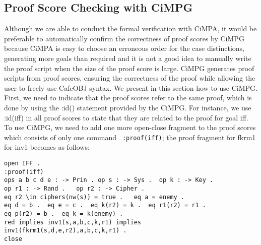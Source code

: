 \documentclass[a4paper,fleqn]{cas-dc}
\begin{document}
\subsection{Proof Score Checking with CiMPG} \label{cimpg}
Although we are able to conduct the formal verification with
CiMPA, it would be preferable to automatically confirm the correctness of proof scores by CiMPG because CiMPA is easy to choose an erroneous order for the case distinctions, generating more goals than required and it is not a good idea to manually write the proof script when the size of the proof score is large. CiMPG generates proof scripts from proof scores, ensuring the correctness of the proof while allowing the user to freely use CafeOBJ syntax. We present in this section how to use CiMPG.
First, we need to indicate that the proof scores refer to the same proof, which is done by using the :id() statement provided by the CiMPG. For instance, we use :id(iff) in all proof scores to state that they are related to the proof for goal iff. 
To use CiMPG, we need to add one more open-close fragment to the proof scores which consists of only one command \verb! :proof(iff)!; the proof fragment for fkrm1 for inv1 becomes as follows:
\begin{verbatim}
open IFF .
:proof(iff)
ops a b c d e : -> Prin . op s : -> Sys .  op k : -> Key .  
op r1 : -> Rand .   op r2 : -> Cipher .
eq r2 \in ciphers(nw(s)) = true .   eq a = enemy .
eq d = b .  eq e = c .  eq k(r2) = k .  eq r1(r2) = r1 .    
eq p(r2) = b .  eq k = k(enemy) .
red implies inv1(s,a,b,c,k,r1) implies
inv1(fkrm1(s,d,e,r2),a,b,c,k,r1) .
close
\end{verbatim}
\end{document}
